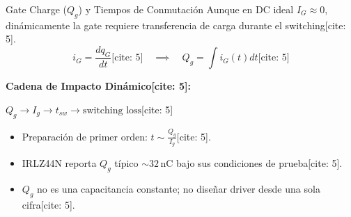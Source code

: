 \documentclass[aspectratio=169, table]{beamer}
\begin{document}
\begin{frame}{Gate Charge ($Q_g$) y Tiempos de Conmutación}
    Aunque en DC ideal $I_G \approx 0$, dinámicamente la gate requiere transferencia de carga durante el switching[cite: 5].
    \begin{equation*}
        i_G = \frac{dq_G}{dt} \text{[cite: 5]} \quad \implies \quad Q_g = \int i_G(t) dt \text{[cite: 5]}
    \end{equation*}
    
    \vspace{0.2cm}
    \textbf{Cadena de Impacto Dinámico[cite: 5]:}
    \begin{center}
        $Q_g \rightarrow I_g \rightarrow t_{sw} \rightarrow \text{switching loss}$[cite: 5]
    \end{center}
    
    \vspace{0.2cm}
    \begin{itemize}
        \item Preparación de primer orden: $t \sim \frac{Q_g}{I_g}$[cite: 5].
        \item IRLZ44N reporta $Q_g$ típico $\sim 32\,\text{nC}$ bajo sus condiciones de prueba[cite: 5].
        \item $Q_g$ no es una capacitancia constante; no diseñar driver desde una sola cifra[cite: 5].
    \end{itemize}
\end{frame}
\end{document}

